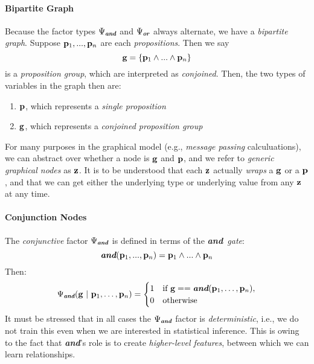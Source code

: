 \documentclass[11pt]{article}
\newcommand{\zvariable}{{\bf z}}
\newcommand{\pvariable}{{\bf p}}
\newcommand{\gvariable}{{\bf g}}
\newcommand{\condsep}{\ |\ }
\newcommand{\opand}{\textbf{\em and}}
\newcommand{\opor}{\textbf{\em or}}
\begin{document}
 
\paragraph{Bipartite Graph}
Because the factor types $\Psi_\opand$ and $\Psi_\opor$ always alternate, we have a {\em bipartite graph}.
Suppose $\pvariable_1, ..., \pvariable_n$ are each {\em propositions}.
Then we say 
\begin{equation} \gvariable = \left\{\pvariable_1 \wedge ... \wedge \pvariable_n\right\} \end{equation}
is a {\em proposition group}, which are interpreted as {\em conjoined}.
Then, the two types of variables in the graph then are:
\begin{enumerate}
    \item $\pvariable$, which represents a {\em single proposition}
    \item $\gvariable$, which represents a {\em conjoined proposition group}
\end{enumerate}
For many purposes in the graphical model (e.g., {\em message passing} calculuations), we can abstract over whether a node is $\gvariable$ and $\pvariable$, and we refer to {\em generic graphical nodes} as $\zvariable$.
It is to be understood that each $\zvariable$ actually {\em wraps} a $\gvariable$ or a $\pvariable$, and that we can get either the underlying type or underlying value from any $\zvariable$ at any time.

\paragraph{Conjunction Nodes}
The {\em conjunctive} factor $\Psi_\opand$ is defined in terms of the {\em \opand\ gate}:
\begin{equation} \opand(\pvariable_1, ..., \pvariable_n) = \pvariable_1 \wedge ... \wedge \pvariable_n \end{equation}
Then:
\begin{equation}
    \Psi_{\opand}(\gvariable \condsep \pvariable_1, \ldots, \pvariable_n) = 
    \begin{cases} 
        1 & \text{if } \gvariable == \opand(\pvariable_1, \ldots, \pvariable_n), \\
        0 & \text{otherwise}
    \end{cases}
\end{equation}
It must be stressed that in all cases the $\Psi_\opand$ factor is {\em deterministic}, i.e., we do not train this even when we are interested in statistical inference.
This is owing to the fact that \opand's role is to create {\em higher-level features}, between which we can learn relationships.
\end{document}
